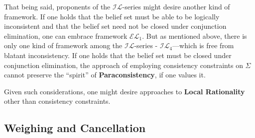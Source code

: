 \documentclass[12pt]{article}
\begin{document}
\par
That being said, proponents of the $\mathcal{IL}$-series might desire another kind of framework. If one holds that the belief set must be able to be logically inconsistent and that the belief set need not be closed under conjunction elimination, one can embrace framework $\mathcal{EL}_1$. But as mentioned above, there is only one kind of framework among the $\mathcal{IL}$-series - $\mathcal{IL}_4$---which is free from blatant inconsistency. If one holds that the belief set must be closed under conjunction elimination, the approach of employing consistency constraints on $\Sigma$ cannot preserve the ``spirit'' of \textbf{Paraconsistency}, if one values it.
\par
Given such considerations, one might desire approaches to \textbf{Local Rationality} other than consistency constraints.


\subsection{Weighing and Cancellation}
\end{document}
